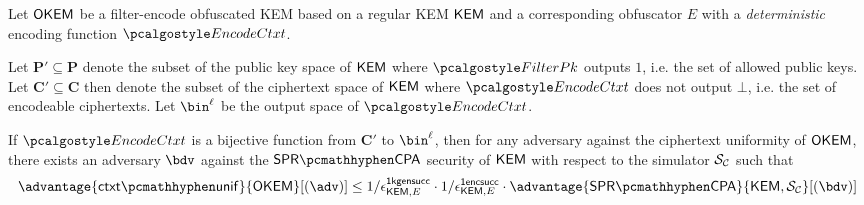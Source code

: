\begin{lemma}
\label{lem:ctxt-unif-for-bijections}
    Let $\mathsf{OKEM}$ be a filter-encode obfuscated KEM based on a regular KEM $\mathsf{KEM}$ and a corresponding obfuscator $E$ with a \emph{deterministic} encoding function $\encodectxt$.

    Let $\mathbf{P}' \subseteq \mathbf{P}$ denote the subset of the public key space of $\mathsf{KEM}$ where $\filterpk$ outputs $1$, i.e. the set of allowed public keys.
    Let $\mathbf{C}' \subseteq \mathbf{C}$ then denote the subset of the ciphertext space of $\mathsf{KEM}$ where $\encodectxt$ does not output $\bot$, i.e. the set of encodeable ciphertexts.
    Let $\bin^\ell$ be the output space of $\encodectxt$.

    If $\encodectxt$ is a bijective function from $\mathbf{C}'$ to $\bin^\ell$, then for any adversary against the ciphertext uniformity of $\mathsf{OKEM}$, there exists an adversary $\bdv$ against the $\sprcpa$ security of $\mathsf{KEM}$ with respect to the simulator $\mathcal{S}_\mathcal{C}$ such that
    \[
        \advantage{\ctxtunif}{\OKEM}[(\adv)]
        \leq 1/\epsilon^\firstkeygensuccess_{\KEM,E}
        \cdot 1/\epsilon^\firstencapssuccess_{\KEM,E}
        \cdot \advantage{\sprcpa}{\KEM,\simulunif}[(\bdv)]
    \]
\end{lemma}
